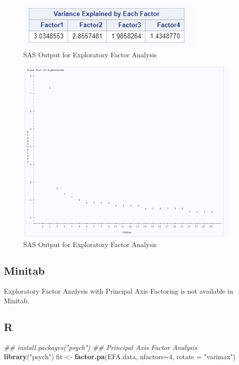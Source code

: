 \documentclass[
]{book}
\newenvironment{Shaded}{\begin{snugshade}}{\end{snugshade}}
\newcommand{\CommentTok}[1]{\textcolor[rgb]{0.56,0.35,0.01}{\textit{#1}}}
\newcommand{\DataTypeTok}[1]{\textcolor[rgb]{0.13,0.29,0.53}{#1}}
\newcommand{\DecValTok}[1]{\textcolor[rgb]{0.00,0.00,0.81}{#1}}
\newcommand{\KeywordTok}[1]{\textcolor[rgb]{0.13,0.29,0.53}{\textbf{#1}}}
\newcommand{\NormalTok}[1]{#1}
\newcommand{\StringTok}[1]{\textcolor[rgb]{0.31,0.60,0.02}{#1}}
\begin{document}
\begin{figure}[!h]
\includegraphics{Screenshots/Exploratory Factor Analysis/efaSAS1} \caption{\label{fig:efaSAS}SAS Output for Exploratory Factor Analysis}\label{fig:efaSAS}
\end{figure}

\begin{figure}[!h]
\includegraphics{Screenshots/Exploratory Factor Analysis/efaSAS2} \caption{\label{fig:efaSAS2}SAS Output for Exploratory Factor Analysis}\label{fig:efaSAS2}
\end{figure}

\hypertarget{minitab-1}{%
\subsection{Minitab}\label{minitab-1}}

Exploratory Factor Analysis with Principal Axis Factoring is not available in Minitab.

\hypertarget{r-1}{%
\subsection{R}\label{r-1}}

\begin{Shaded}
\begin{Highlighting}[]
\CommentTok{## install.packages("psych")}
\CommentTok{## Principal Axis Factor Analysis}
\KeywordTok{library}\NormalTok{(}\StringTok{"psych"}\NormalTok{)}
\NormalTok{fit <-}\StringTok{ }\KeywordTok{factor.pa}\NormalTok{(EFA.data, }\DataTypeTok{nfactors=}\DecValTok{4}\NormalTok{, }\DataTypeTok{rotate =} \StringTok{"varimax"}\NormalTok{)}
\end{Highlighting}
\end{Shaded}
\end{document}
